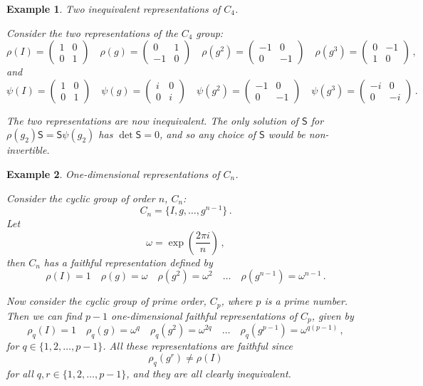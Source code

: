\documentclass{article}
\theoremstyle{plain}\theoremheaderfont{\normalfont\itshape}\theorembodyfont{\rmfamily}\theoremseparator{.}\newtheorem*{rem}{Remark}\newtheorem*{ex}{Example}\newtheorem*{proof}{Proof}\newtheorem*{altp}{Alternative proof}
\theoremstyle{plain}\theoremheaderfont{\normalfont\bfseries}\theorembodyfont{\rmfamily}\theoremseparator{.}\newtheorem{thm}{Theorem}[section]\newtheorem{lem}[thm]{Lemma}\newtheorem{prop}[thm]{Proposition}\newtheorem*{cor}{Corollary}\newtheorem{defn}[thm]{Definition}\newtheorem{clm}[thm]{Claim}\newtheorem{clminproof}{Claim}
\theoremstyle{break}\theoremheaderfont{\normalfont\itshape}\theorembodyfont{\rmfamily}\theoremseparator{.\medskip}\newtheorem*{proofskip}{Proof}\newtheorem*{exs}{Examples}\newtheorem*{rems}{Remarks}
\theoremstyle{break}\theoremheaderfont{\normalfont\bfseries}\theorembodyfont{\rmfamily}\theoremseparator{.\medskip}\newtheorem{lemskip}[thm]{Lemma}\newtheorem{defnskip}[thm]{Definition}\newtheorem{propskip}[thm]{Proposition}\newtheorem{thmskip}[thm]{Theorem}
\numberwithin{equation}{section}
\begin{document}
	\begin{ex}
		\textit{Two inequivalent representations of \(C_4\).}

		Consider the two representations of the \(C_4\) group:
		\[\rho(I)=\begin{pmatrix}
			1 & 0\\
			0 & 1
		\end{pmatrix}\quad\rho(g)=\begin{pmatrix}
			0 & 1\\
			-1 & 0
		\end{pmatrix}\quad\rho(g^2)=\begin{pmatrix}
			-1 & 0\\
			0 & -1
		\end{pmatrix}\quad\rho(g^3)=\begin{pmatrix}
			0 & -1\\
			1 & 0
		\end{pmatrix}\,,\]
		and
		\[\psi(I)=\begin{pmatrix}
			1 & 0\\
			0 & 1
		\end{pmatrix}\quad\psi(g)=\begin{pmatrix}
			i & 0\\
			0 & i
		\end{pmatrix}\quad\psi(g^2)=\begin{pmatrix}
			-1 & 0\\
			0 & -1
		\end{pmatrix}\quad\psi(g^3)=\begin{pmatrix}
			-i & 0\\
			0 & -i
		\end{pmatrix}\,.\]

		The two representations are now inequivalent. The only solution of \(\mathsf{S}\) for \(\rho(g_2)\mathsf{S}=\mathsf{S}\psi(g_2)\) has \(\det\mathsf{S}=0\), and so any choice of \(\mathsf{S}\) would be non-invertible.
	\end{ex}
	\begin{ex}
		\textit{One-dimensional representations of \(C_n\).}

		Consider the cyclic group of order \(n\), \(C_n\):
		\[C_n=\{I,g,\dots,g^{n-1}\}\,.\]
		Let
		\[\omega=\exp(\frac{2\pi i}{n})\,,\]
		then \(C_n\) has a faithful representation defined by
		\[\rho(I)=1\quad\rho(g)=\omega\quad\rho(g^2)=\omega^2\quad\dots\quad\rho(g^{n-1})=\omega^{n-1}\,.\]

		Now consider the cyclic group of prime order, \(C_p\), where \(p\) is a prime number. Then we can find \(p-1\) one-dimensional faithful representations of \(C_p\), given by
		\[\rho_q(I)=1\quad\rho_q(g)=\omega^q\quad\rho_q(g^2)=\omega^{2q}\quad\dots\quad\rho_q(g^{p-1})=\omega^{q(p-1)}\,,\]
		for \(q\in\{1,2,\dots,p-1\}\). All these representations are faithful since
		\[\rho_q(g^r)\ne \rho(I)\]
		for all \(q,r\in\{1,2,\dots,p-1\}\), and they are all clearly inequivalent.
	\end{ex}
\end{document}
